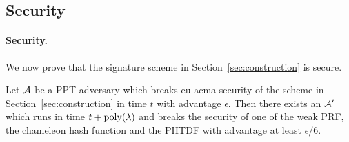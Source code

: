 

\subsection{Security}
\label{sec:security}

\paragraph{Security.} We now prove that the signature scheme in Section~\ref{sec:construction} is
  secure.
\begin{theorem} Let $\mathcal{A}$ be a PPT adversary which breaks eu-acma
  security of the scheme in Section~\ref{sec:construction} in time $t$
  with advantage $\epsilon$. Then there exists an $\mathcal{A}'$ which runs
  in time $t+\operatorname{poly}(\lambda)$ and breaks the security of one
  of the weak PRF, the chameleon hash function and the PHTDF with
  advantage at least $\epsilon/6$.
\end{theorem} 
